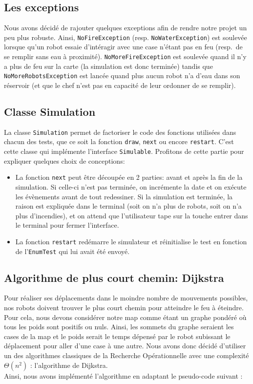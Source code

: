 \documentclass[a4paper,8pt]{article} %
\begin{document}
\subsection{Les exceptions}

Nous avons décidé de rajouter quelques exceptions afin de rendre notre projet un peu plus robuste. 
Ainsi, {\tt NoFireException} (resp. {\tt NoWaterException}) est soulevée lorsque qu'un robot essaie d'intéragir avec une case n'étant pas en feu (resp.\ de se remplir sans eau à proximité).
{\tt NoMoreFireException} est soulevée quand il n'y a plus de feu sur la carte (la simulation est donc terminée) tandis que {\tt NoMoreRobotsException} est lancée quand plus aucun robot n'a d'eau dans son réservoir (et que le chef n'est pas en capacité de leur ordonner de se remplir).


\subsection{Classe Simulation}

La classe {\tt Simulation} permet de factoriser le code des fonctions utilisées dans chacun des tests, que ce soit la fonction {\tt draw}, {\tt next} ou encore {\tt restart}.
C'est cette classe qui implémente l'interface {\tt Simulable}.
Profitons de cette partie pour expliquer quelques choix de conceptions:
\begin{itemize}
    \item La fonction {\tt next} peut être découpée en 2 parties: avant et après la fin de la simulation. 
    Si celle-ci n'est pas terminée, on incrémente la date et on exécute les évènements avant de tout redessiner. 
    Si la simulation est terminée, la raison est expliquée dans le terminal (soit on n'a plus de robots, soit on n'a plus d'incendies), et on attend que l'utilisateur tape sur la touche entrer dans le terminal pour fermer l'interface. 
    \item La fonction {\tt restart} redémarre le simulateur et réinitialise le test en fonction de l'{\tt EnumTest} qui lui avait été envoyé. 
\end{itemize}

\subsection{Algorithme de plus court chemin: Dijkstra}

Pour réaliser ses déplacements dans le moindre nombre de mouvements possibles, nos robots doivent trouver le plus court chemin pour atteindre le feu à éteindre. 
Pour cela, nous devons considérer notre map comme étant un graphe pondéré où tous les poids sont positifs ou nuls. 
Ainsi, les sommets du graphe seraient les cases de la map et le poids serait le temps dépensé par le robot subissant le déplacement pour aller
d'une case à une autre. Nous avons donc décidé d'utiliser un des algorithmes classiques de la Recherche Opérationnelle avec une 
complexité $\Theta(n^2)$ : l'algorithme de Dijkstra. \\
Ainsi, nous avons implémenté l'algorithme en adaptant le pseudo-code suivant : \\
\end{document}
